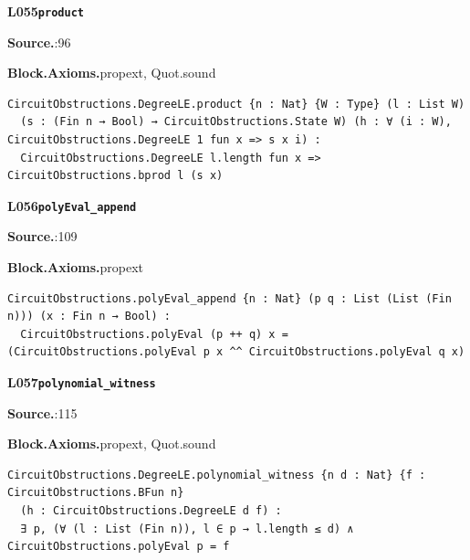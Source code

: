 \par\medskip\noindent\begin{minipage}{\textwidth}
{\small\bfseries L055\enspace\texttt{product}\par}
{\footnotesize\raggedright\textbf{Source.}\enspace{}:96\par
\textbf{Block.}\quad\textbf{Axioms.}\enspace propext, Quot.sound\par}\nopagebreak
\begin{lstlisting}
CircuitObstructions.DegreeLE.product {n : Nat} {W : Type} (l : List W)
  (s : (Fin n → Bool) → CircuitObstructions.State W) (h : ∀ (i : W), CircuitObstructions.DegreeLE 1 fun x => s x i) :
  CircuitObstructions.DegreeLE l.length fun x => CircuitObstructions.bprod l (s x)
\end{lstlisting}
\end{minipage}\par

\par\medskip\noindent\begin{minipage}{\textwidth}
{\small\bfseries L056\enspace\texttt{polyEval\_append}\par}
{\footnotesize\raggedright\textbf{Source.}\enspace{}:109\par
\textbf{Block.}\quad\textbf{Axioms.}\enspace propext\par}\nopagebreak
\begin{lstlisting}
CircuitObstructions.polyEval_append {n : Nat} (p q : List (List (Fin n))) (x : Fin n → Bool) :
  CircuitObstructions.polyEval (p ++ q) x = (CircuitObstructions.polyEval p x ^^ CircuitObstructions.polyEval q x)
\end{lstlisting}
\end{minipage}\par

\par\medskip\noindent\begin{minipage}{\textwidth}
{\small\bfseries L057\enspace\texttt{polynomial\_witness}\par}
{\footnotesize\raggedright\textbf{Source.}\enspace{}:115\par
\textbf{Block.}\quad\textbf{Axioms.}\enspace propext, Quot.sound\par}\nopagebreak
\begin{lstlisting}
CircuitObstructions.DegreeLE.polynomial_witness {n d : Nat} {f : CircuitObstructions.BFun n}
  (h : CircuitObstructions.DegreeLE d f) :
  ∃ p, (∀ (l : List (Fin n)), l ∈ p → l.length ≤ d) ∧ CircuitObstructions.polyEval p = f
\end{lstlisting}
\end{minipage}\par

